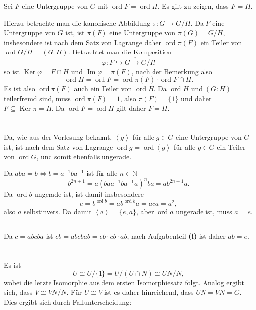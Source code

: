 \documentclass[a4paper,10pt]{article}
\theoremstyle{definition}
\newcommand{\N}{\mathbb{N}}
\newcommand{\ord}{\operatorname{ord}}
\newcommand{\Img}{\operatorname{Im}}
\newcommand{\Ker}{\operatorname{Ker}}
\newcommand{\gen}[1]{\left\langle#1\right\rangle}
\begin{document}
Sei $F$ eine Untergruppe von $G$ mit $\ord F = \ord H$. Es gilt zu zeigen, dass $F = H$.

Hierzu betrachte man die kanonische Abbildung $\pi : G \rightarrow G/H$. Da $F$ eine Untergruppe von $G$ ist, ist $\pi(F)$ eine Untergruppe von $\pi(G) = G/H$, insbesondere ist nach dem Satz von Lagrange daher $\ord \pi(F)$ ein Teiler von $\ord G/H = (G : H)$. Betrachtet man die Komposition
\[
 \varphi: F \hookrightarrow G \xrightarrow{\pi} G/H
\]
so ist $\Ker \varphi = F \cap H$ und $\Img \varphi = \pi(F)$, nach der Bemerkung also
\[
 \ord H = \ord F = \ord \pi(F) \cdot \ord F \cap H.
\]
Es ist also $\ord \pi(F)$ auch ein Teiler von $\ord H$. Da $\ord H$ und $(G : H)$ teilerfremd sind, muss $\ord \pi(F) = 1$, also $\pi(F) = \{1\}$ und daher $F \subseteq \Ker \pi = H$. Da $\ord F = \ord H$ gilt daher $F = H$.









\section{}


\subsection{}
Da, wie aus der Vorlesung bekannt, $\gen{g}$ für alle $g \in G$ eine Untergruppe von $G$ ist, ist nach dem Satz von Lagrange $\ord g = \ord \gen{g}$ für alle $g \in G$ ein Teiler von $\ord G$, und somit ebenfalls ungerade.

Da $aba = b \Leftrightarrow b = a^{-1} b a^{-1}$ ist für alle $n \in \N$
\[
 b^{2n+1} = a (b a a^{-1} b a^{-1} a)^n ba = ab^{2n+1}a.
\]
Da $\ord b$ ungerade ist, ist damit insbesondere
\[
 e = b^{\ord b} = ab^{\ord b}a = aea = a^2,
\]
also $a$ selbstinvers. Da damit $\gen{a} = \{e, a\}$, aber $\ord a$ ungerade ist, muss $a = e$.



\subsection{}
Da $c = abcba$ ist $cb = abcbab = ab \cdot cb \cdot ab$, nach Aufgabenteil \textbf{(i)} ist daher $ab = e$.




\section{}
Es ist
\[
 U \cong U / \{1\} = U / (U \cap N) \cong UN/N,
\]
wobei die letzte Isomorphie aus dem ersten Isomorphiesatz folgt. Analog ergibt sich, dass $V \cong VN/N$. Für $U \cong V$ ist es daher hinreichend, dass $UN = VN = G$. Dies ergibt sich durch Fallunterscheidung:
\end{document}
